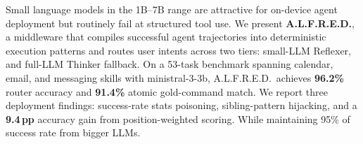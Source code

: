 Small language models in the 1B--7B range are attractive for on-device agent deployment but routinely fail at structured tool use. We present \textbf{A.L.F.R.E.D.}, a middleware that compiles successful agent trajectories into deterministic execution patterns and routes user intents across two tiers: small-LLM Reflexer, and full-LLM Thinker fallback. On a 53-task benchmark spanning calendar, email, and messaging skills with ministral-3-3b, A.L.F.R.E.D.\ achieves \textbf{96.2\%} router accuracy and \textbf{91.4\%} atomic gold-command match. We report three deployment findings: success-rate stats poisoning, sibling-pattern hijacking, and a \textbf{9.4\,pp} accuracy gain from position-weighted scoring.
While maintaining 95\% of success rate from bigger LLMs.
